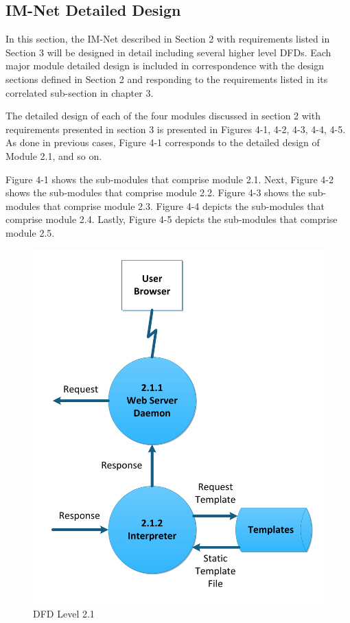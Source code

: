 \documentclass[letterpaper,12pt]{article}
\newcounter{qcounter}						%
\newcommand{\Section}[1]{\section{#1} \setcounter{figure}{0}}
\begin{document}
{\begin{list}{H -- :~}{}
\end{list}

\eject

\textcolor{section}{\Section{IM-Net Detailed Design}}

In this section, the IM-Net described in Section 2 with requirements listed in Section 3 will be designed in detail including several higher level DFDs. Each major module detailed design is included in correspondence with the design sections defined in Section 2 and responding to the requirements listed in its correlated sub-section in chapter 3.

The detailed design of each of the four modules discussed in section 2 with requirements presented in section 3 is presented in Figures 4-1, 4-2, 4-3, 4-4, 4-5. As done in previous cases, Figure 4-1 corresponds to the detailed design of Module 2.1, and so on.

Figure 4-1 shows the sub-modules that comprise module 2.1. Next, Figure 4-2 shows the  sub-modules that comprise module 2.2. Figure 4-3 shows the sub-modules that comprise module 2.3. Figure 4-4 depicts the sub-modules that comprise module 2.4. Lastly, Figure 4-5 depicts the sub-modules that comprise module 2.5.

\begin{figure}[h!]
\centering
\includegraphics[scale=0.6]{DFD_level_2_1.pdf}
\caption{DFD Level 2.1}
\label{fig:DFD_level_2.1}
\end{figure}

}
\end{document}
